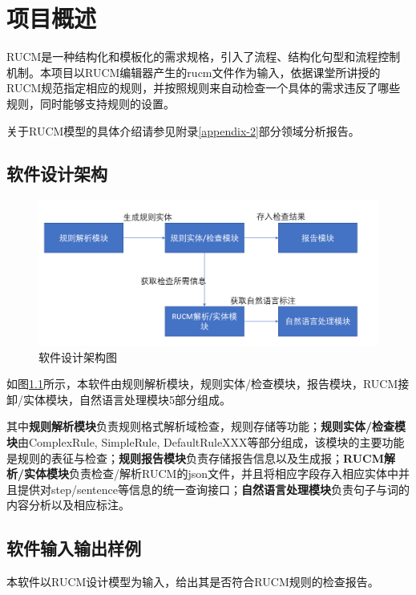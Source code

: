 \chapter{项目概述}

RUCM是一种结构化和模板化的需求规格，引入了流程、结构化句型和流程控制机制。本项目以RUCM编辑器产生的rucm文件作为输入，依据课堂所讲授的RUCM规范指定相应的规则，并按照规则来自动检查一个具体的需求违反了哪些规则，同时能够支持规则的设置。


关于RUCM模型的具体介绍请参见附录\ref{appendix-2}部分领域分析报告。

\section{软件设计架构}
\begin{figure}[htbp]
    \begin{center}
        \includegraphics[scale=0.55]{src/introduction-1.png}
        \caption{软件设计架构图}
        \label{fig-introduction-1}
    \end{center}
\end{figure}

如图\ref{fig-introduction-1}所示，本软件由规则解析模块，规则实体/检查模块，报告模块，RUCM接卸/实体模块，自然语言处理模块5部分组成。

其中\textbf{规则解析模块}负责规则格式解析域检查，规则存储等功能；\textbf{规则实体/检查模块}由ComplexRule, SimpleRule, DefaultRuleXXX等部分组成，该模块的主要功能是规则的表征与检查；\textbf{规则报告模块}负责存储报告信息以及生成报；\textbf{RUCM解析/实体模块}负责检查/解析RUCM的json文件，并且将相应字段存入相应实体中并且提供对step/sentence等信息的统一查询接口；\textbf{自然语言处理模块}负责句子与词的内容分析以及相应标注。

\section{软件输入输出样例}
本软件以RUCM设计模型为输入，给出其是否符合RUCM规则的检查报告。
